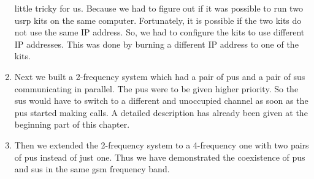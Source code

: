 \begin{enumerate}
    little tricky for us. Because we had to figure out if it was possible to
    run two \gls{usrp} kits on the same computer. Fortunately, it is possible if the
    two kits do not use the same IP address. So, we had to configure the kits
    to use different IP addresses. This was done by burning a different IP 
    address to one of the kits.
    \item Next we built a 2-frequency system which had a pair of \glspl{pu}
    and a pair of \glspl{su} communicating in parallel. The \glspl{pu} 
    were to be given higher priority. So the \glspl{su} would have
    to switch to a different and unoccupied channel as soon as the \glspl{pu}
    started making calls. A detailed description has already been given
    at the beginning part of this chapter.
    \item Then we extended the 2-frequency system to a 4-frequency one
    with two pairs of \glspl{pu} instead of just one. Thus we have 
    demonstrated the coexistence of \glspl{pu} and \glspl{su} in the 
    same \gls{gsm} frequency band.
\end{enumerate}



